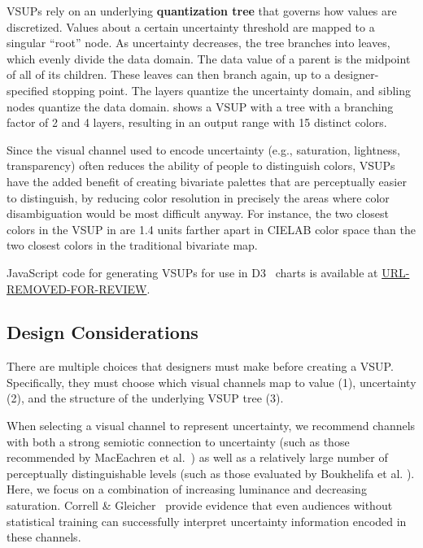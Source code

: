 VSUPs rely on an underlying \textbf{quantization tree} that governs how values are discretized. Values about a certain uncertainty threshold are mapped to a singular ``root'' node. As uncertainty decreases, the tree branches into leaves, which evenly divide the data domain. The data value of a parent is the midpoint of all of its children. These leaves can then branch again, up to a designer-specified stopping point. The layers quantize the uncertainty domain, and sibling nodes quantize the data domain.  shows a VSUP with a tree with a branching factor of 2 and 4 layers, resulting in an output range with 15 distinct colors.

Since the visual channel used to encode uncertainty (e.g., saturation, lightness, transparency) often reduces the ability of people to distinguish colors, VSUPs have the added benefit of creating bivariate palettes that are perceptually easier to distinguish, by reducing color resolution in precisely the areas where color disambiguation would be most difficult anyway. For instance, the two closest colors in the VSUP in  are 1.4 units farther apart in CIELAB color space than the two closest colors in the traditional bivariate map.

JavaScript code for generating VSUPs for use in D3~\cite{bostock2011d3} charts is available at \url{URL-REMOVED-FOR-REVIEW}.

\subsection{Design Considerations}

There are multiple choices that designers must make before creating a VSUP. Specifically, they must choose which visual channels map to value (1), uncertainty (2), and the structure of the underlying VSUP tree (3).

When selecting a visual channel to represent uncertainty, we recommend channels with both a strong semiotic connection to uncertainty (such as those recommended by MacEachren et al.~\cite{maceachren2012visual}) as well as a relatively large number of perceptually distinguishable levels (such as those evaluated by Boukhelifa et al. \cite{boukhelifa2012evaluating}). Here, we focus on a combination of increasing luminance and decreasing saturation. Correll \& Gleicher~\cite{correll2013error} provide evidence that even audiences without statistical training can successfully interpret uncertainty information encoded in these channels.

